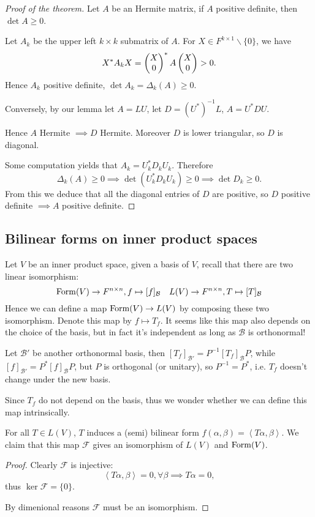 \begin{proof}[Proof of the theorem]
    Let $A$ be an Hermite matrix, if $A$ positive definite,
	then $\det A \ge 0$.

	Let $A_k$ be the upper left $k\times k$ submatrix of $A$.
	For $X \in F^{k\times 1} \backslash \{0\}$, we have
	\[
	X^* A_k X = \begin{pmatrix} X\\0 \end{pmatrix}^* A \begin{pmatrix} X\\0 \end{pmatrix} > 0.
	\]
	Hence $A_k$ positive definite, $\det A_k = \Delta_k(A) \ge 0$.

	Conversely, by our lemma let $A = LU$,
	let $D = (U^*)^{-1} L$, $A = U^*DU$.

	Hence $A$ Hermite $\implies D$ Hermite.
	Moreover $D$ is lower triangular, so $D$ is diagonal.

	Some computation yields that $A_k = U_k^* D_k U_k$.
	Therefore
	\[
		\Delta_k(A) \ge 0 \implies \det(U_k^* D_k U_k) \ge 0
		\implies \det D_k \ge 0.
	\]
	From this we deduce that all the diagonal entries of $D$ are positive,
	so $D$ positive definite $\implies A$ positive definite.
\end{proof}

\subsection{Bilinear forms on inner product spaces}
\label{sub:Bilinear forms on inner product spaces}
Let $V$ be an inner product space, given a basis of $V$,
recall that there are two linear isomorphism:
\[
	\operatorname{Form}(V) \to F^{n\times n}, f\mapsto [f]_{\mathcal{B}}
	\quad L(V) \to F^{n\times n}, T\mapsto [T]_{\mathcal{B}}
\]
Hence we can define a map $\operatorname{Form}(V) \to L(V)$ by composing these two isomorphism.
Denote this map by $f\mapsto T_f$.
It seems like this map also depends on the choice of the basis,
but in fact it's independent as long as $\mathcal{B}$ is orthonormal!

Let $\mathcal{B}'$ be another orthonormal basis,
then $[T_f]_{\mathcal{B}'} = P^{-1} [T_f]_{\mathcal{B}} P$,
while $[f]_{\mathcal{B}'} = P^* [f]_{\mathcal{B}} P$, but $P$ is
orthogonal (or unitary), so $P^{-1} = P^*$, i.e. $T_f$ doesn't change
under the new basis.

Since $T_f$ do not depend on the basis, thus we wonder whether we can
define this map intrinsically.
\begin{proposition}
	For all $T\in L(V)$, $T$ induces a (semi) bilinear form
	$f(\alpha, \beta) = \left<T\alpha, \beta \right>$.
	We claim that this map $\mathcal{F}$ gives an isomorphism of $L(V)$
	and $\operatorname{Form}(V)$.
\end{proposition}
\begin{proof}[Proof]
    Clearly $\mathcal{F}$ is injective:
	\[
	\left<T\alpha, \beta \right> = 0, \forall \beta \implies T\alpha = 0,
	\]
	thus $\ker \mathcal{F} = \{0\}$.

	By dimenional reasons $\mathcal{F}$ must be an isomorphism.
\end{proof}


